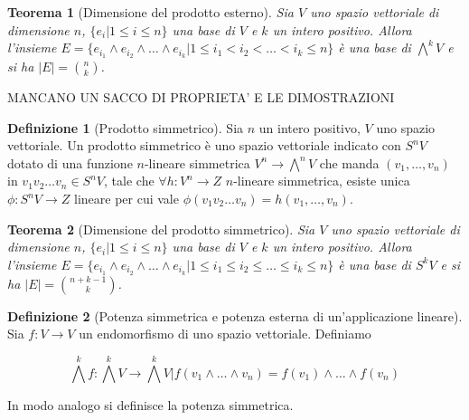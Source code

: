 \documentclass[11pt]{article}
\theoremstyle{plain}
\newtheorem{thm}{Teorema}[section]
\theoremstyle{definition}
\newtheorem{defn}{Definizione}[section]
\theoremstyle{remark}
\begin{document}
\begin{thm}[Dimensione del prodotto esterno]
Sia $V$ uno spazio vettoriale di dimensione $n$, $\{e_i| 1 \leq i \leq n\}$ una base di $V$ e $k$ un intero positivo.
Allora l'insieme $E=\{e_{i_1} \wedge e_{i_2}\wedge \ldots \wedge e_{i_k}| 1 \leq i_1 < i_2 <\ldots< i_k \leq n\}$ è una base di $\bigwedge^k V$ 
e si ha $|E|= \binom {n}{k}$.

\label{thm:prodotto esterno}
\end{thm}


MANCANO UN SACCO DI PROPRIETA' E LE DIMOSTRAZIONI





\begin{defn}[Prodotto simmetrico]

Sia $n$ un intero positivo, $V$ uno spazio vettoriale. Un prodotto simmetrico è uno spazio vettoriale indicato con $S^n V$
dotato di una funzione $n$-lineare simmetrica $V^n \to \bigwedge^n V$ che manda $(v_1,\ldots,v_n)$ in 
$v_1 v_2\ldots v_n \in S^n V$, tale che $\forall h: V^n \to Z$ $n$-lineare simmetrica, 
esiste unica $\phi: S^n V \to Z $ lineare per cui vale $\phi(v_1 v_2 \ldots v_n)=h(v_1,\ldots,v_n)$.

\label{defn:prodotto simmetrico}
\end{defn}





\begin{thm}[Dimensione del prodotto simmetrico]

Sia $V$ uno spazio vettoriale di dimensione $n$, $\{e_i| 1 \leq i \leq n\}$ una base di $V$ e $k$ un intero positivo.
Allora l'insieme $E=\{e_{i_1} \wedge e_{i_2}\wedge\ldots \wedge e_{i_k}| 1 \leq i_1 \leq i_2 \leq\ldots\leq i_k \leq n\}$ è una base di $S^k V$ 
e si ha $|E|= \binom {n+k-1}{k}$.

\label{thm:prodotto simmetrico}
\end{thm}


\begin{defn}[Potenza simmetrica e potenza esterna di un'applicazione lineare]

Sia $f: V\to V$ un endomorfismo di uno spazio vettoriale. Definiamo 

\[\bigwedge^k f : \bigwedge^k V \to \bigwedge^k V | f(v_1 \wedge \ldots \wedge v_n) = f(v_1) \wedge \ldots \wedge f(v_n) \]

In modo analogo si definisce la potenza simmetrica.


\end{defn}
\end{document}
